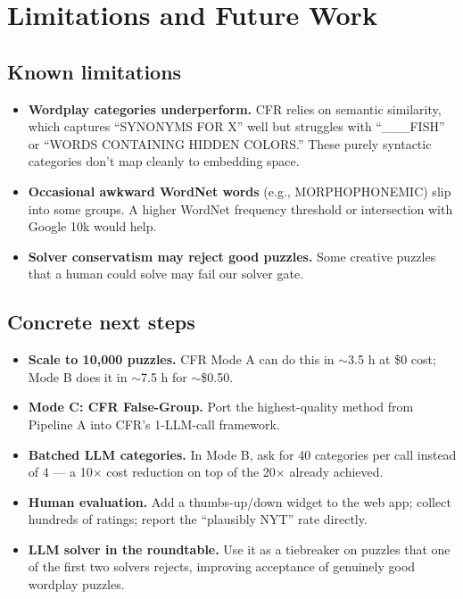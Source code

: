 \documentclass[11pt, letterpaper]{article}
\begin{document}
\section{Limitations and Future Work}

\subsection{Known limitations}
\begin{itemize}[leftmargin=*, itemsep=0.1em]
\item \textbf{Wordplay categories underperform.} CFR relies on semantic similarity,
which captures ``SYNONYMS FOR X'' well but struggles with ``\_\_\_FISH'' or
``WORDS CONTAINING HIDDEN COLORS.'' These purely syntactic categories don't
map cleanly to embedding space.
\item \textbf{Occasional awkward WordNet words} (e.g., MORPHOPHONEMIC) slip into
some groups. A higher WordNet frequency threshold or intersection with Google 10k
would help.
\item \textbf{Solver conservatism may reject good puzzles.} Some creative puzzles
that a human could solve may fail our solver gate.
\end{itemize}

\subsection{Concrete next steps}
\begin{itemize}[leftmargin=*, itemsep=0.1em]
\item \textbf{Scale to 10{,}000 puzzles.} CFR Mode A can do this in $\sim$3.5 h at
\$0 cost; Mode B does it in $\sim$7.5 h for $\sim$\$0.50.
\item \textbf{Mode C: CFR False-Group.} Port the highest-quality method from
Pipeline A into CFR's 1-LLM-call framework.
\item \textbf{Batched LLM categories.} In Mode B, ask for 40 categories per call
instead of 4 --- a 10$\times$ cost reduction on top of the 20$\times$ already achieved.
\item \textbf{Human evaluation.} Add a thumbs-up/down widget to the web app;
collect hundreds of ratings; report the ``plausibly NYT'' rate directly.
\item \textbf{LLM solver in the roundtable.} Use it as a tiebreaker on puzzles that
one of the first two solvers rejects, improving acceptance of genuinely good
wordplay puzzles.
\end{itemize}
\end{document}
